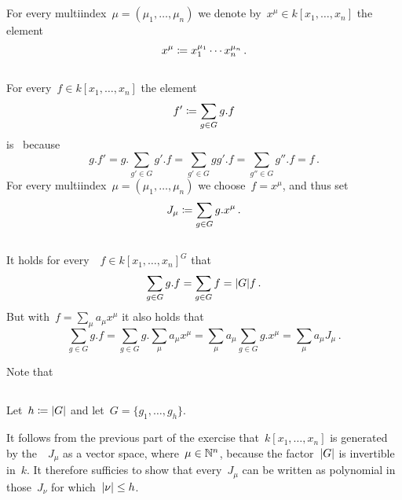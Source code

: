\section{}

For every multiindex~$\mu = (\mu_1, \dotsc, \mu_n)$ we denote by~$x^\mu \in k[x_1, \dotsc, x_n]$ the element
\[
            x^\mu
  \coloneqq  x_1^{\mu_1} \dotsm x_n^{\mu_n} \,.
\]





\subsection{}

For every~$f \in k[x_1, \dotsc, x_n]$ the element
\[
            f'
  \coloneqq  \sum_{g \in G} g.f
\]
is~ because
\[
    g.f'
  = g.\sum_{g' \in G} g'.f
  = \sum_{g' \in G} g g'.f
  = \sum_{g'' \in G} g''.f
  = f \,.
\]
For every multiindex~$\mu = (\mu_1, \dotsc, \mu_n)$ we choose~$f = x^\mu$, and thus set
\[
            J_\mu
  \coloneqq  \sum_{g \in G} g.x^\mu  \,.
\]





\subsection{}

It holds for every~~$f \in k[x_1, \dotsc, x_n]^G$ that
\[
    \sum_{g \in G} g.f
  = \sum_{g \in G} f
  = \lvert G\rvert f \,.
\]
But with~$f = \sum_{\mu} a_\mu x^\mu$ it also holds that
\[
    \sum_{g \in G} g.f
  = \sum_{g \in G} g.\sum_{\mu} a_\mu x^\mu
  = \sum_{\mu} a_\mu \sum_{g \in G} g.x^\mu
  = \sum_{\mu} a_\mu J_\mu \,.
\]

Note that




\subsection{}

Let~$h \coloneqq \lvert G\rvert$ and let~$G = \{g_1, \dotsc, g_h\}$.

It follows from the previous part of the exercise that~$k[x_1, \dotsc, x_n]$ is generated by the~~$J_\mu$ as a vector space, where~$\mu \in \mathbb{N}^n$, because the factor~$\lvert G\rvert$ is invertible in~$k$.
It therefore sufficies to show that every~$J_\mu$ can be written as polynomial in those~$J_\nu$ for which~$\lvert\nu\rvert \leq h$.
  
